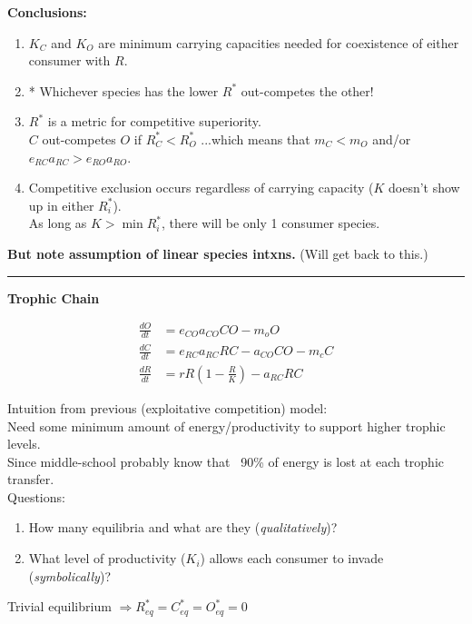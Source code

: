 \documentclass{article}
\newcommand{\note}[1]{\colorbox{gray!30}{#1}}
\newcommand{\ind}{\-\hspace{1cm}}
\newcommand*\circled[1]{\tikz[baseline=(char.base)]{
            \node[shape=circle,draw,inner sep=2pt] (char) {#1};}}
\begin{document}
\textbf{Conclusions:}
\begin{enumerate}
\item $K_C$ and $K_O$ are minimum carrying capacities needed for coexistence of either consumer with $R$.
\item* Whichever species has the lower $R^*$ out-competes the other!
\item $R^*$ is a metric for competitive superiority.\\
\ind $C$ out-competes $O$ if $R_C^* < R_O^*$ ...which means that $m_C < m_O$ and/or $e_{RC} a_{RC} > e_{RO} a_{RO}$.

\item Competitive exclusion occurs regardless of carrying capacity ($K$ doesn't show up in either $R_i^*$).\\
\ind As long as $K>\min R_i^*$, there will be only 1 consumer species.\\
\end{enumerate}
\textbf{But note assumption of linear species intxns.}  (Will get back to this.)

\rule[0.5ex]{\linewidth}{1pt}
\pagebreak
\begin{center}	\textbf{Trophic Chain} \end{center}
\begin{align*}
		\frac{dO}{dt}&=e_{CO}a_{CO}C O - m_o O\\
		\frac{dC}{dt}&=e_{RC}a_{RC}R C -a_{CO}CO- m_c C\\
		\frac{dR}{dt}&=r R \left(1-\frac{R}{K}\right) - a_{RC}RC
\end{align*}

Intuition from previous (exploitative competition) model:\\
\ind Need some minimum amount of energy/productivity to support higher trophic levels.\\
\ind Since middle-school probably know that ~90\% of energy is lost at each trophic transfer.\\

\note{Questions:}
\begin{enumerate}
	\item How many equilibria and what are they (\emph{qualitatively})?
	\item What level of productivity ($K_i$) allows each consumer to invade (\emph{symbolically})?
\end{enumerate}

\circled{1} Trivial equilibrium $\Rightarrow R_{eq}^*=C_{eq}^*=O_{eq}^*=0$\\
\end{document}
